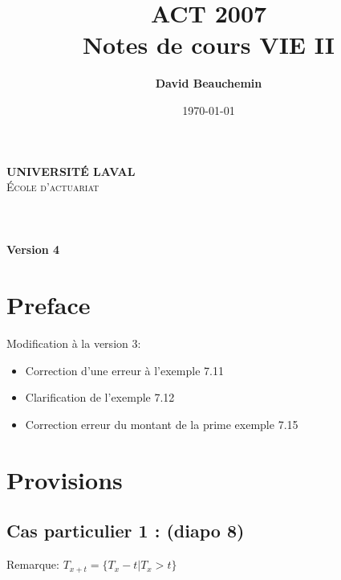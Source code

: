\documentclass[11pt,french]{report}
\title{ACT 2007 \\ Notes de cours VIE II}
\author{\textbf{David Beauchemin}}
\date{\today}
\begin{document}
\makeatletter
  \begin{titlepage}
  \centering
      {\large \textbf{\textsc{UNIVERSITÉ LAVAL}}}\\
      \textsc{École d'actuariat}\\
    \vspace{2cm}
    \vspace{2cm}
      {\LARGE \textbf{\@title}} \\
    \vfill
       {\large \@author} \\
    \vspace{4cm}
        {\large\textbf{\@date}}\\
    \vfill
    {\large\textbf{Version 4}}\\
    \vfill
  \end{titlepage}
\makeatother
\newpage

\tableofcontents

\chapter*{Preface}
Modification à la version 3: \\
\begin{itemize}
\item Correction d'une erreur à l'exemple 7.11 
\item Clarification de l'exemple 7.12
\item Correction erreur du montant de la prime exemple 7.15
\end{itemize}

\chapter{Provisions}
\label{chap:provi}

\section{Cas particulier 1 : (diapo 8)}
Remarque: $ T_{x+t} = \lbrace T_x -t | T_x > t\rbrace $
\end{document}

